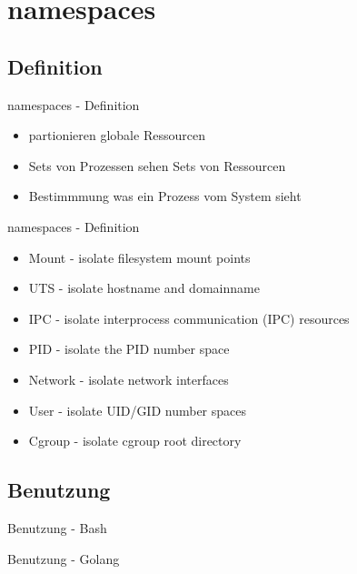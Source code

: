 \documentclass[14pt]{beamer}
\begin{document}
    \section{namespaces}
    \subsection{Definition}
    \begin{frame}{namespaces - Definition}
    \begin{itemize}
    \item partionieren globale Ressourcen
    \item Sets von Prozessen sehen Sets von Ressourcen
    \item Bestimmmung was ein Prozess vom System sieht
    \end{itemize}
    
    \end{frame}
    \begin{frame}{namespaces - Definition}
    \begin{itemize}
    \item Mount - isolate filesystem mount points
	\item UTS - isolate hostname and domainname
	\item IPC - isolate interprocess communication (IPC) resources
	\item PID - isolate the PID number space
	\item Network - isolate network interfaces
	\item User - isolate UID/GID number spaces
  	\item Cgroup - isolate cgroup root directory
    \end{itemize}
    \end{frame}
    
    \subsection{Benutzung}
    \begin{frame}{Benutzung - Bash}
    
    \end{frame}
    
    \begin{frame}{Benutzung - Golang}
    
    \end{frame}
    
\end{document}
